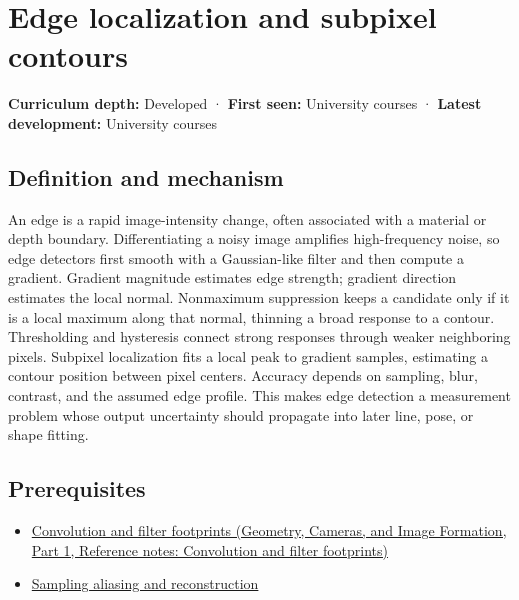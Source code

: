 \hypertarget{appendix-36022286b03e}{}\label{referencestart:appendix-36022286b03e}
\section{Edge localization and subpixel contours}\label{appendix-36022286b03e-edge-localization-and-subpixel-contours}

\hypertarget{appendix-36022286b03e-edge-localization-and-subpixel-contours}{}

\textbf{Curriculum depth:} Developed · \textbf{First seen:} University courses · \textbf{Latest development:} University courses

\begin{allmightroledefinition}

\subsection{Definition and mechanism}\label{appendix-36022286b03e-definition-and-mechanism}

\hypertarget{appendix-36022286b03e-definition-and-mechanism}{}

An edge is a rapid image-intensity change, often associated with a material or depth boundary. Differentiating a noisy image amplifies high-frequency noise, so edge detectors first smooth with a Gaussian-like filter and then compute a gradient. Gradient magnitude estimates edge strength; gradient direction estimates the local normal. Nonmaximum suppression keeps a candidate only if it is a local maximum along that normal, thinning a broad response to a contour. Thresholding and hysteresis connect strong responses through weaker neighboring pixels. Subpixel localization fits a local peak to gradient samples, estimating a contour position between pixel centers. Accuracy depends on sampling, blur, contrast, and the assumed edge profile. This makes edge detection a measurement problem whose output uncertainty should propagate into later line, pose, or shape fitting.

\end{allmightroledefinition}

\subsection{Prerequisites}\label{appendix-36022286b03e-prerequisites}

\hypertarget{appendix-36022286b03e-prerequisites}{}

\begin{itemize}
\tightlist
\item
  \href{../03-Geometry-Cameras-and-Image-Formation-P01/main.pdf\#nameddest=appendix-d5b3c692d9f0}{Convolution and filter footprints (Geometry, Cameras, and Image Formation, Part 1, Reference notes: Convolution and filter footprints)}
\item
  \hyperref[appendix-6a7869dd79a6]{Sampling aliasing and reconstruction}
\end{itemize}

